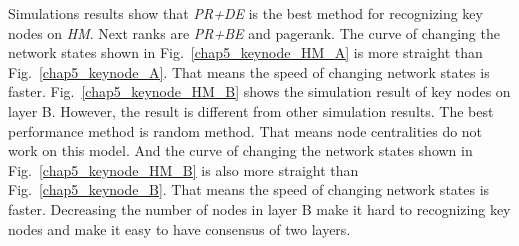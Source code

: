 Simulations results show that \textit{PR+DE} is the best method for recognizing key nodes on \textit{HM}. Next ranks are \textit{PR+BE} and pagerank. The curve of changing the network states shown in Fig.~\ref{chap5_keynode_HM_A} is more straight than Fig.~\ref{chap5_keynode_A}. That means the speed of changing network states is faster. 
Fig.~\ref{chap5_keynode_HM_B} shows the simulation result of key nodes on layer B. However, the result is different from other simulation results. The best performance method is random method. That means node centralities do not work on this model. And the curve of changing the network states shown in Fig.~\ref{chap5_keynode_HM_B} is also more straight than Fig.~\ref{chap5_keynode_B}. That means the speed of changing network states is faster. Decreasing the number of nodes in layer B make it hard to recognizing key nodes and make it easy to have consensus of two layers. 

